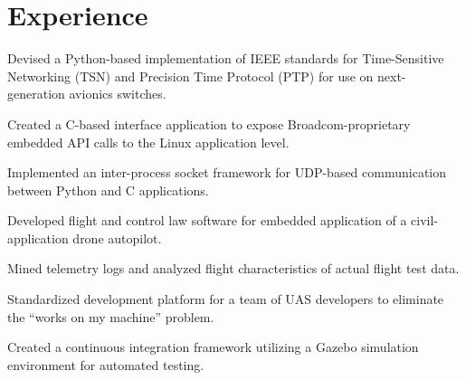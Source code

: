 \documentclass[]{deedy-resume-openfont}
\begin{document}

%
%



\section{Experience}


\begin{tightemize}
\item Devised a Python-based implementation of IEEE standards for Time-Sensitive Networking (TSN) and Precision Time Protocol (PTP) for use on next-generation avionics switches.
\item Created a C-based interface application to expose Broadcom-proprietary embedded API calls to the Linux application level.
\item  Implemented an inter-process socket framework for UDP-based communication between Python and C applications.
\end{tightemize}

\begin{tightemize}
\item Developed flight and control law software for embedded application of a civil-application drone autopilot.
\item Mined telemetry logs and analyzed flight characteristics of actual flight test data.
\item Standardized development platform for a team of UAS developers to eliminate the ``works on my machine'' problem.
\item  Created a continuous integration framework utilizing a Gazebo simulation environment for automated testing.
\end{tightemize}
\end{document}
